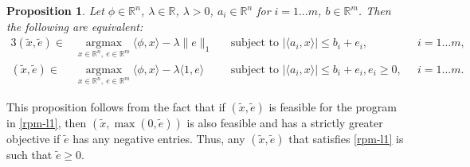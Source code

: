 \documentclass[12pt]{article}
\newcommand{\argmax}[1]{\underset{#1}{\operatorname{argmax}}}
\newcommand{\1}{\mathbbm{1}}
\DeclareMathOperator*{\supp}{supp}
\newcommand{\xo}{x_0}
\newcommand{\R}{\mathbb{R}}
\newcommand{\etam}{\eta^-}
\newcommand{\aixo}{\langle a_i, \xo \rangle}
\newcommand{\xtilde}{\tilde{x}}
\newcommand{\etilde}{\tilde{e}}
\newtheorem{theorem}{Theorem} %
\newtheorem{proposition}[theorem]{Proposition}
\begin{document}
%



\begin{proposition} \label{prop:equiv}
Let $\phi \in \R^n$, $\lambda \in \R$, $\lambda>0$, $a_i \in \R^n$ for $i = 1 \ldots m$, $b \in \R^m$.  Then  the following are equivalent:
\begin{alignat}{3}
(\xtilde, \etilde) \in  &\argmax{x \in \R^n, \ e \in \R^m} \langle \phi, x \rangle - \lambda \| e\|_1 &&\text{subject to } | \langle a_i, x \rangle | \leq b_i + e_i \label{rpm-l1}, \quad &&i = 1\ldots m,\\
(\xtilde, \etilde) \in &\argmax{x \in \R^n, \ e \in \R^m} \langle \phi, x \rangle - \lambda \langle 1, e \rangle \ &&\text{subject to } | \langle a_i, x \rangle | \leq b_i + e_i, e_i \geq 0, \quad &&i = 1\ldots m. \label{rpm-pos}
\end{alignat}
\end{proposition}
This proposition follows from the fact that if $(\xtilde, \etilde)$ is feasible for the program in \eqref{rpm-l1}, then $(\xtilde, \max(0,\etilde))$ is also feasible and has a strictly greater objective if $\etilde$ has any negative entries. Thus, any $(\xtilde, \etilde)$ that satisfies \eqref{rpm-l1} is such that $\etilde \geq 0$.

\end{document}
